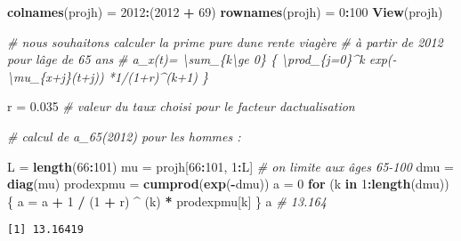 \documentclass[
]{article}
\newenvironment{Shaded}{\begin{snugshade}}{\end{snugshade}}
\newcommand{\CommentTok}[1]{\textcolor[rgb]{0.56,0.35,0.01}{\textit{#1}}}
\newcommand{\ControlFlowTok}[1]{\textcolor[rgb]{0.13,0.29,0.53}{\textbf{#1}}}
\newcommand{\DecValTok}[1]{\textcolor[rgb]{0.00,0.00,0.81}{#1}}
\newcommand{\FloatTok}[1]{\textcolor[rgb]{0.00,0.00,0.81}{#1}}
\newcommand{\FunctionTok}[1]{\textcolor[rgb]{0.13,0.29,0.53}{\textbf{#1}}}
\newcommand{\NormalTok}[1]{#1}
\newcommand{\OtherTok}[1]{\textcolor[rgb]{0.56,0.35,0.01}{#1}}
\newcommand{\SpecialCharTok}[1]{\textcolor[rgb]{0.81,0.36,0.00}{\textbf{#1}}}
\begin{document}
\begin{Shaded}
\begin{Highlighting}[]
\FunctionTok{colnames}\NormalTok{(projh) }\OtherTok{=} \DecValTok{2012}\SpecialCharTok{:}\NormalTok{(}\DecValTok{2012} \SpecialCharTok{+} \DecValTok{69}\NormalTok{)}
\FunctionTok{rownames}\NormalTok{(projh) }\OtherTok{=} \DecValTok{0}\SpecialCharTok{:}\DecValTok{100}
\FunctionTok{View}\NormalTok{(projh)}

\CommentTok{\# nous souhaitons calculer la prime pure d\textquotesingle{}une rente viagère }
\CommentTok{\# à partir de 2012 pour l\textquotesingle{}âge de 65 ans}
\CommentTok{\# a\_x(t)= \textbackslash{}sum\_\{k\textbackslash{}ge 0\} \{ \textbackslash{}prod\_\{j=0\}\^{}k exp({-}\textbackslash{}mu\_\{x+j\}(t+j)) *1/(1+r)\^{}(k+1) \}}

\NormalTok{r }\OtherTok{=} \FloatTok{0.035} \CommentTok{\# valeur du taux choisi pour le facteur d\textquotesingle{}actualisation}

\CommentTok{\# calcul de a\_65(2012) pour les hommes :}

\NormalTok{L }\OtherTok{=} \FunctionTok{length}\NormalTok{(}\DecValTok{66}\SpecialCharTok{:}\DecValTok{101}\NormalTok{)}
\NormalTok{mu }\OtherTok{=}\NormalTok{ projh[}\DecValTok{66}\SpecialCharTok{:}\DecValTok{101}\NormalTok{, }\DecValTok{1}\SpecialCharTok{:}\NormalTok{L] }\CommentTok{\# on limite aux âges 65{-}100}
\NormalTok{dmu }\OtherTok{=} \FunctionTok{diag}\NormalTok{(mu)}
\NormalTok{prodexpmu }\OtherTok{=} \FunctionTok{cumprod}\NormalTok{(}\FunctionTok{exp}\NormalTok{(}\SpecialCharTok{{-}}\NormalTok{dmu))}
\NormalTok{a }\OtherTok{=} \DecValTok{0}
\ControlFlowTok{for}\NormalTok{ (k }\ControlFlowTok{in} \DecValTok{1}\SpecialCharTok{:}\FunctionTok{length}\NormalTok{(dmu))}
\NormalTok{\{}
\NormalTok{  a }\OtherTok{=}\NormalTok{ a }\SpecialCharTok{+} \DecValTok{1} \SpecialCharTok{/}\NormalTok{ (}\DecValTok{1} \SpecialCharTok{+}\NormalTok{ r) }\SpecialCharTok{\^{}}\NormalTok{ (k) }\SpecialCharTok{*}\NormalTok{ prodexpmu[k]}
\NormalTok{\}}
\NormalTok{a  }\CommentTok{\# 13.164}
\end{Highlighting}
\end{Shaded}

\begin{verbatim}
[1] 13.16419
\end{verbatim}
\end{document}
